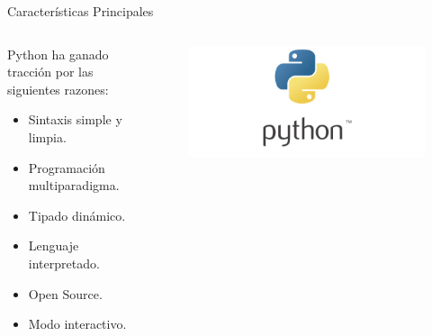 \documentclass[10pt]{beamer}
\begin{document}
\begin{frame}{Características Principales}
    \begin{columns}
        \begin{column}{0.6\textwidth}
            Python ha ganado tracción por las siguientes razones:
            \begin{itemize}
                \item Sintaxis simple y limpia.
                \item Programación multiparadigma.
                \item Tipado dinámico.
                \item Lenguaje interpretado.
                \item Open Source.
                \item Modo interactivo.
            \end{itemize}
        \end{column}
        \begin{column}{0.4\textwidth}
            \begin{figure}[!h] 
                \centering
                \includegraphics[width=1.35\textwidth]{img/logo2}
            \end{figure}
        \end{column}
    \end{columns}
    
\end{frame}
\end{document}
